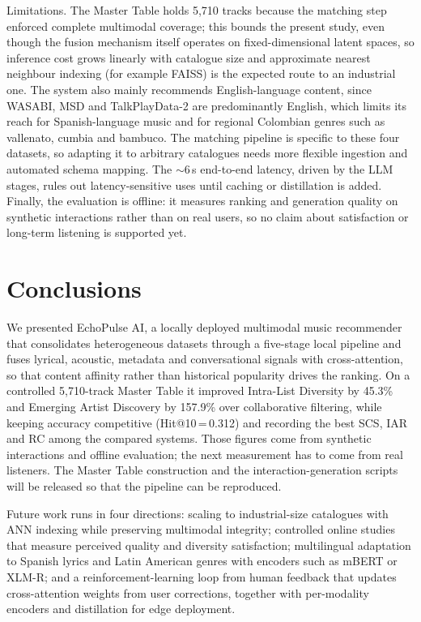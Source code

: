 \documentclass[]{ceurart}
\begin{document}
Limitations. The Master Table holds 5,710 tracks because the matching step
enforced complete multimodal coverage; this bounds the present study, even
though the fusion mechanism itself operates on fixed-dimensional latent spaces,
so inference cost grows linearly with catalogue size and approximate nearest
neighbour indexing (for example FAISS) is the expected route to an industrial
one. The system also mainly recommends English-language content, since WASABI,
MSD and TalkPlayData-2 are predominantly English, which limits its reach for
Spanish-language music and for regional Colombian genres such as vallenato,
cumbia and bambuco. The matching pipeline is specific to these four datasets, so
adapting it to arbitrary catalogues needs more flexible ingestion and automated
schema mapping. The $\sim$6\,s end-to-end latency, driven by the LLM stages,
rules out latency-sensitive uses until caching or distillation is added.
Finally, the evaluation is offline: it measures ranking and generation quality on
synthetic interactions rather than on real users, so no claim about satisfaction
or long-term listening is supported yet.

\section{Conclusions}
\label{sec:conclusion}

We presented EchoPulse AI, a locally deployed multimodal music recommender that
consolidates heterogeneous datasets through a five-stage local pipeline and fuses
lyrical, acoustic, metadata and conversational signals with cross-attention, so
that content affinity rather than historical popularity drives the ranking. On a
controlled 5,710-track Master Table it improved Intra-List Diversity by 45.3\%
and Emerging Artist Discovery by 157.9\% over collaborative filtering, while
keeping accuracy competitive (Hit@10\,=\,0.312) and recording the best SCS, IAR
and RC among the compared systems. Those figures come from synthetic
interactions and offline evaluation; the next measurement has to come from real
listeners. The Master Table construction and the interaction-generation scripts
will be released so that the pipeline can be reproduced.

Future work runs in four directions: scaling to industrial-size catalogues with
ANN indexing while preserving multimodal integrity; controlled online studies
that measure perceived quality and diversity satisfaction; multilingual
adaptation to Spanish lyrics and Latin American genres with encoders such as
mBERT or XLM-R; and a reinforcement-learning loop from human feedback that
updates cross-attention weights from user corrections, together with
per-modality encoders and distillation for edge deployment.
\end{document}
